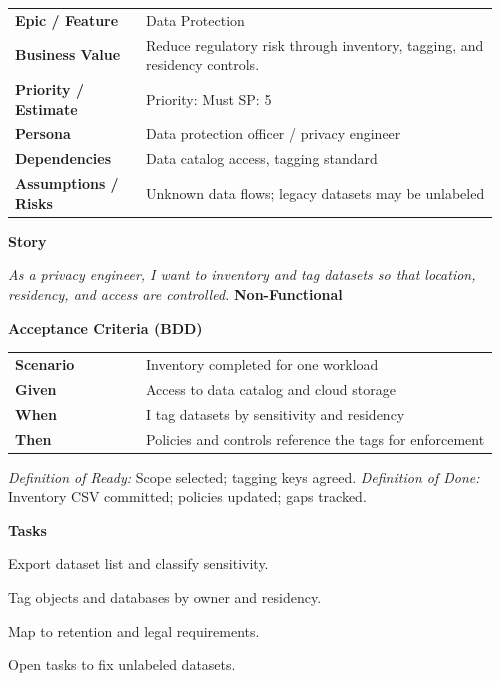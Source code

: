 \documentclass[11pt,letterpaper]{article}
\makeatletter
\newenvironment{kvtable}{%
  \begin{tabular}{@{}>{\bfseries\arraybackslash}p{0.26\linewidth} p{0.70\linewidth}@{}}
}{\end{tabular}}
\newenvironment{bdd}{%
  \begin{tabular}{@{}>{\bfseries\arraybackslash}p{0.26\linewidth} p{0.70\linewidth}@{}}
}{\end{tabular}}
\newcommand{\DoRDoD}[2]{%
  \vspace{0.35em}
  {\footnotesize\color{Muted}%
    \textit{Definition of Ready:} #1 \; \textbullet\;
    \textit{Definition of Done:} #2%
  }%
}
\newenvironment{storycard}[2]{%
  \begin{tcolorbox}[cloudcard, title={#1 --- #2}]%
}{\end{tcolorbox}}
\newcommand{\sectionlabel}[1]{\vspace{0.35em}\textbf{#1}\par}
\makeatother
\begin{document}
\begin{storycard}{CCS-4}{Ch. 4 — Privacy \& Trust Baselines}
\begin{kvtable}
Epic / Feature & Data Protection\\
Business Value & Reduce regulatory risk through inventory, tagging, and residency controls.\\
Priority / Estimate & Priority: Must \quad SP: 5\\
Persona & Data protection officer / privacy engineer\\
Dependencies & Data catalog access, tagging standard\\
Assumptions / Risks & Unknown data flows; legacy datasets may be unlabeled\\
\end{kvtable}
\sectionlabel{Story}
\textit{As a privacy engineer, I want to inventory and tag datasets so that location, residency, and access are controlled.}
\sectionlabel{Non-Functional}\;\;
\sectionlabel{Acceptance Criteria (BDD)}
\begin{bdd}
Scenario & Inventory completed for one workload\\
Given & Access to data catalog and cloud storage\\
When & I tag datasets by sensitivity and residency\\
Then & Policies and controls reference the tags for enforcement\\
\end{bdd}
\DoRDoD{Scope selected; tagging keys agreed.}{Inventory CSV committed; policies updated; gaps tracked.}
\sectionlabel{Tasks}
\begin{checklist}
\item Export dataset list and classify sensitivity.
\item Tag objects and databases by owner and residency.
\item Map to retention and legal requirements.
\item Open tasks to fix unlabeled datasets.
\end{checklist}
\end{storycard}
\end{document}
